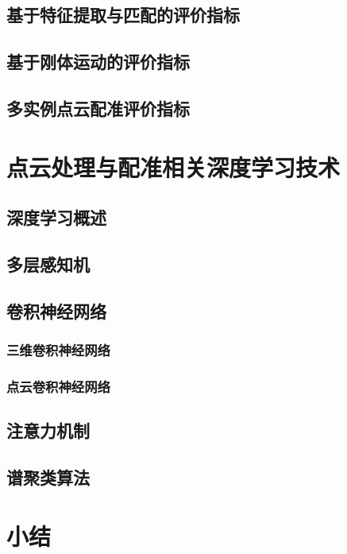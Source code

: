 \subsection{基于特征提取与匹配的评价指标}
\subsection{基于刚体运动的评价指标}
\subsection{多实例点云配准评价指标}

\section{点云处理与配准相关深度学习技术}
\subsection{深度学习概述}
\subsection{多层感知机}
\subsection{卷积神经网络}
\subsubsection{三维卷积神经网络}
\subsubsection{点云卷积神经网络}
\subsection{注意力机制}
\subsection{谱聚类算法}

\section{小结}

